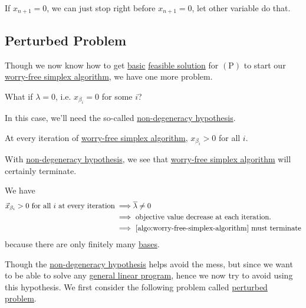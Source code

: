 \begin{remark}
	If \(x_{n+1} = 0\), we can just stop right before \(x_{n+1} = 0\), let other variable do that.
\end{remark}

\subsection{Perturbed Problem}
Though we now know how to get \hyperref[def:basic-solution]{basic} \hyperref[def:feasible-solution]{feasible solution} for \((\mathrm{P})\) to start our \hyperref[algo:worry-free-simplex-algorithm]{worry-free simplex algorithm}, we have one more problem.

\begin{problem}\label{prob:degenerate-problem}
What if \(\lambda = 0\), i.e. \(x_{\beta _{i} } = 0\) for some \(i\)?
\end{problem}

In this case, we'll need the so-called \hyperref[conj:non-degeneracy-hypothesis]{non-degeneracy hypothesis}.

\begin{conjecture}\label{conj:non-degeneracy-hypothesis}
	At every iteration of \hyperref[algo:worry-free-simplex-algorithm]{worry-free simplex algorithm}, \(x_{\beta _{i} } > 0\) for all \(i\).
\end{conjecture}

\begin{remark}
	With \hyperref[conj:non-degeneracy-hypothesis]{non-degeneracy hypothesis}, we see that \hyperref[algo:worry-free-simplex-algorithm]{worry-free simplex algorithm} will certainly terminate.
\end{remark}
\begin{explanation}
	We have
	\[
		\begin{split}
			\vec{x}_{\beta_i} > 0 \text{ for all \(i\) at every iteration}
			\implies &\overline{\lambda} \neq 0\\
			\implies &\text{ objective value decrease at each iteration.}\\
			\implies &\text{ \autoref{algo:worry-free-simplex-algorithm} must terminate}
		\end{split}
	\]
	because there are only finitely many \hyperref[def:basis]{bases}.
\end{explanation}

Though the \hyperref[conj:non-degeneracy-hypothesis]{non-degeneracy hypothesis} helps avoid the mess, but since we want to be able to solve any \hyperref[def:general-linear-programming-problem]{general linear program}, hence we now try to avoid using this hypothesis. We first consider the following problem called \hyperref[def:perturbed-problem]{perturbed problem}.

